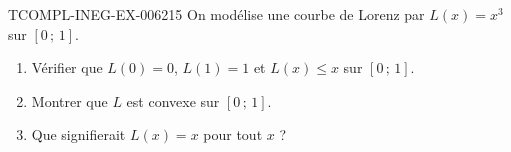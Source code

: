 \begin{exercice}{TCOMPL-INEG-EX-006}{2}{15}
On modélise une courbe de Lorenz par $L(x)=x^3$ sur $[0\,;\,1]$.
\begin{enumerate}
  \item Vérifier que $L(0)=0$, $L(1)=1$ et $L(x)\leq x$ sur $[0\,;\,1]$.
  \item Montrer que $L$ est convexe sur $[0\,;\,1]$.
  \item Que signifierait $L(x)=x$ pour tout $x$ ?
\end{enumerate}
\end{exercice}
